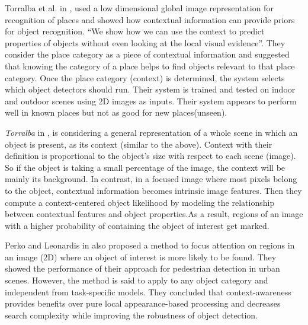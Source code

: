 Torralba et al. in \cite{TrollbaContexBased}, used a low dimensional global image 
     representation for recognition of places and showed how contextual information can provide priors for object recognition. ``We show how we can use the context to predict properties of objects without even looking at the local visual evidence''. They consider the place category as a piece of contextual information and suggested that knowing the category of a place helps to find objects relevant to that place category. Once the place category (context) is determined, the system selects which object detectors should run. Their system is trained and tested on indoor and outdoor scenes using 2D images as inputs. Their system appears to perform well in known places but not as good for new places(unseen).
%      
     
     
     {\it Torralba} in \cite{TorralbaContextualPriming}, is considering a general representation of a whole scene in which an object is present, as its context (similar to the above). Context with their definition is proportional to the object's size with respect to each scene (image). So if the object is taking a small percentage of the image, the context will be mainly its background. In contrast, in a focused image where most pixels belong to the object, contextual information becomes intrinsic image features. Then they compute a context-centered object likelihood by modeling the relationship between contextual features and object properties.As a result, regions of an image with a higher probability of containing the object of interest get marked.   
     
     Perko and Leonardis in \cite{PerkoLeonardisContextDriven} also proposed a method to focus attention on regions in an image (2D) where an object of interest is more likely to be found. They showed the performance of their approach for pedestrian detection in urban scenes. However, the method is said to apply to any object category and independent from task-specific models. They concluded that context-awareness provides benefits over pure local appearance-based processing and decreases search complexity while improving the robustness of object detection. 
     
